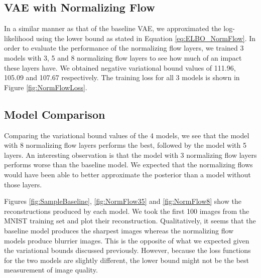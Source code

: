 \documentclass{article}
\begin{document}
\subsection{VAE with Normalizing Flow}
In a similar manner as that of the baseline VAE, we approximated the log-likelihood using the lower bound
as stated in Equation \ref{eq:ELBO_NormFlow}. In order to evaluate the performance of the normalizing 
flow layers, we trained 3 models with 3, 5 and 8 normalizing flow layers to see how much of an impact 
these layers have. We obtained negative variational bound values of 111.96, 105.09 and 107.67 respectively.  
The training loss for all 3 models is shown in Figure \ref{fig:NormFlowLoss}.


\subsection{Model Comparison}
Comparing the variational bound values of the 4 models, we see that the model with 8 normalizing flow layers 
performs the best, followed by the model with 5 layers. An interesting observation is that the model with 
3 normalizing flow layers performs worse than the baseline model. We expected that the normalizing flows 
would have been able to better approximate the posterior than a model without those layers.

Figures \ref{fig:SampleBaseline}, \ref{fig:NormFlow35} and \ref{fig:NormFlow8} show the reconstructions 
produced by each model. We took the first 100 images from the MNIST training set and plot their reconstruction. 
Qualitatively, it seems that the baseline model produces the sharpest images whereas the normalizing flow 
models produce blurrier images. This is the opposite of what we expected given the variational bounds discussed
previously. However, because the loss functions for the two models are slightly different, the lower bound might 
not be the best measurement of image quality.
\end{document}

